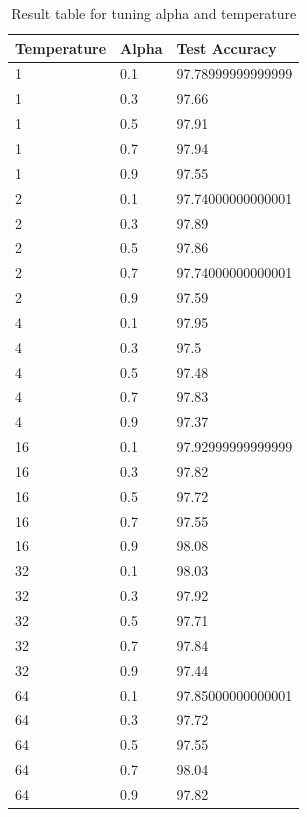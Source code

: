 \documentclass[conference]{IEEEtran}
\begin{document}
\begin{table}[]
    \begin{tabular}{|l|l|l|}
    \hline
    Temperature & Alpha & Test Accuracy      \\ \hline
    1           & 0.1   & 97.78999999999999  \\ \hline
    1           & 0.3   & 97.66 \\ \hline
    1           & 0.5   & 97.91   \\ \hline
    1           & 0.7   & 97.94 \\ \hline
    1           & 0.9   & 97.55  \\ \hline
    2           & 0.1   & 97.74000000000001 \\ \hline
    2           & 0.3   & 97.89 \\ \hline
    2           & 0.5   & 97.86 \\ \hline
    2           & 0.7   & 97.74000000000001  \\ \hline
    2           & 0.9   & 97.59  \\ \hline
    4           & 0.1   & 97.95 \\ \hline
    4           & 0.3   & 97.5 \\ \hline
    4           & 0.5   & 97.48 \\ \hline
    4           & 0.7   & 97.83  \\ \hline
    4           & 0.9   & 97.37 \\ \hline
    16          & 0.1   & 97.92999999999999 \\ \hline
    16          & 0.3   & 97.82 \\ \hline
    16          & 0.5   & 97.72  \\ \hline
    16          & 0.7   & 97.55 \\ \hline
    16          & 0.9   & 98.08  \\ \hline
    32          & 0.1   & 98.03 \\ \hline
    32          & 0.3   & 97.92  \\ \hline
    32          & 0.5   & 97.71 \\ \hline
    32          & 0.7   & 97.84 \\ \hline
    32          & 0.9   & 97.44   \\ \hline
    64          & 0.1   & 97.85000000000001 \\ \hline
    64          & 0.3   & 97.72 \\ \hline
    64          & 0.5   & 97.55 \\ \hline
    64          & 0.7   & 98.04 \\ \hline
    64          & 0.9   & 97.82  \\ \hline
    \end{tabular}
    \caption{Result table for tuning alpha and temperature}
\end{table}\par
\end{document}
